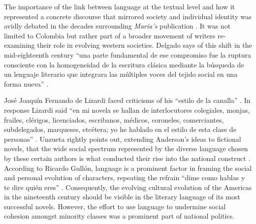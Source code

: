 \documentclass[12pt]{report}\usepackage[]{graphicx}\usepackage[]{color}
\begin{document}
\begin{spacing}{1.9}
The importance of the link between language at the textual level and how it represented a concrete discourse that mirrored society and individual identity was avidly debated in the decades surrounding \textit{María's} publication \autocite[4]{Delgado2000}.
It was not limited to Colombia but rather part of a broader movement of writers re-examining their role in evolving western societies.
Delgado says of this shift in the mid-eighteenth century \enquote{una parte fundamental de ese compromiso fue la ruptura consciente con la homogeneidad de la escritura clásica mediante la búsqueda de un lenguaje literario que integrara las múltiples voces del tejido social en una forma nueva} \autocite[11]{Delgado2000}.

José Joaquín Fernando de Lizardi faced criticisms of his \enquote{estilo de la canalla} \autocite[144]{Unzueta2003}.
In response Lizardi said \enquote{en mi novela se hallan de interlocutores colegiales, monjas, frailes, clérigos, licenciados, escribanos, médicos, coroneles, comerciantes, subdelegados, marqueses, etcétera; yo he hablado en el estilo de esta clase de personas} \autocite[144]{Unzueta2003}.
Unzueta rightly points out, extending Anderson's ideas to fictional novels, that the wide social spectrum represented by the diverse language chosen by these certain authors is what conducted their rise into the national construct \autocite[144]{Unzueta2003}.
According to Ricardo Gullón, language is a prominent factor in framing the social and personal evolution of characters, repeating the refrain \enquote{dime como hablas y te dire quién eres} \autocite[11]{Delgado2000}.
Consequently, the evolving cultural evolution of the Americas in the nineteenth century should be visible in the literary language of its most successful novels.
However, the effort to use language to undermine social cohesion amongst minority classes was a prominent part of national politics.


\end{spacing}
\end{document}

